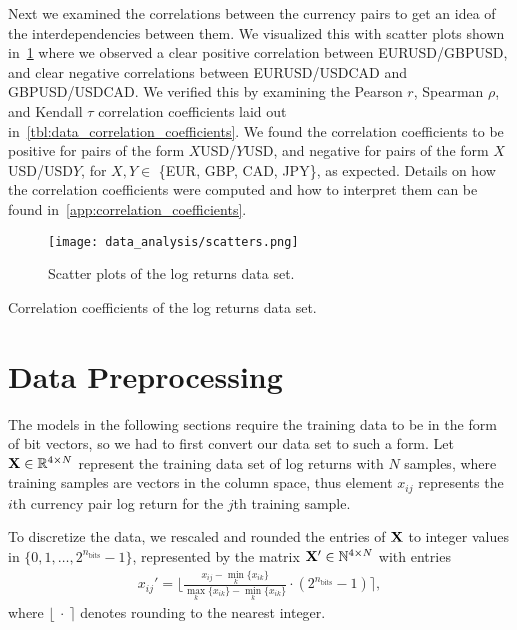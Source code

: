 Next we examined the correlations between the currency pairs to get an idea of the interdependencies between them.
We visualized this with scatter plots shown in~\cref{fig:scatters} where we observed a clear positive correlation between EURUSD/GBPUSD, and clear negative correlations between EURUSD/USDCAD and GBPUSD/USDCAD.
We verified this by examining the Pearson \( r \), Spearman \( \rho \), and Kendall \( \tau \) correlation coefficients laid out in~\cref{tbl:data_correlation_coefficients}.
We found the correlation coefficients to be positive for pairs of the form \( X \)USD/\( Y \)USD, and negative for pairs of the form \( X \)USD/USD\( Y \), for \( X,Y \in \) \{EUR, GBP, CAD, JPY\}, as expected.
Details on how the correlation coefficients were computed and how to interpret them can be found in~\cref{app:correlation_coefficients}.
\begin{figure}[!htb]
    \begin{center}
        \texttt{[image: data\_analysis/scatters.png]}
    \end{center}
    \caption{Scatter plots of the log returns data set.}
    \label{fig:scatters}
\end{figure}

\begin{table}[!htb]
    \centering
    \begin{adjustbox}{max width=\textwidth}
        
    \end{adjustbox}
    \caption{Correlation coefficients of the log returns data set.}
    \label{tbl:data_correlation_coefficients}
\end{table}


\section{Data Preprocessing}
The models in the following sections require the training data to be in the form of bit vectors, so we had to first convert our data set to such a form.
Let \( \mathbf{X} \in \mathbb{R}^{4 \times N} \) represent the training data set of log returns with \( N \) samples, where training samples are vectors in the column space, thus element \( x_{ij} \) represents the \( i \)th currency pair log return for the \( j \)th training sample.

To discretize the data, we rescaled and rounded the entries of \( \mathbf{X} \) to integer values in \( \{0, 1, \dots, 2^{n_\text{bits}} - 1\} \), represented by the matrix \( \mathbf{X}' \in \mathbb{N}^{4 \times N} \) with entries
\begin{align}
    x_{ij}' = \bigg\lfloor \frac{x_{ij} - \min_k \{x_{ik}\}}{\max_k \{x_{ik}\} - \min_k \{x_{ik}\}} \cdot (2^{n_\text{bits}} - 1) \bigg\rceil,
\end{align}
where \( \lfloor \ \cdot \ \rceil \) denotes rounding to the nearest integer.

